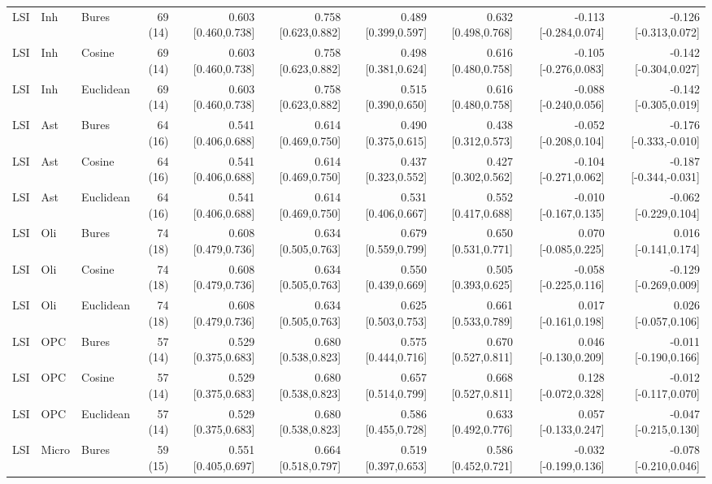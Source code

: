 \documentclass[9pt]{article}
\begin{document}
\begin{landscape}
\begin{longtable}{lllrrrrrrr}
LSI & Inh & Bures & 69 (14) & 0.603 [0.460,0.738] & 0.758 [0.623,0.882] & 0.489 [0.399,0.597] & 0.632 [0.498,0.768] & -0.113 [-0.284,0.074] & -0.126 [-0.313,0.072] \\
LSI & Inh & Cosine & 69 (14) & 0.603 [0.460,0.738] & 0.758 [0.623,0.882] & 0.498 [0.381,0.624] & 0.616 [0.480,0.758] & -0.105 [-0.276,0.083] & -0.142 [-0.304,0.027] \\
LSI & Inh & Euclidean & 69 (14) & 0.603 [0.460,0.738] & 0.758 [0.623,0.882] & 0.515 [0.390,0.650] & 0.616 [0.480,0.758] & -0.088 [-0.240,0.056] & -0.142 [-0.305,0.019] \\
LSI & Ast & Bures & 64 (16) & 0.541 [0.406,0.688] & 0.614 [0.469,0.750] & 0.490 [0.375,0.615] & 0.438 [0.312,0.573] & -0.052 [-0.208,0.104] & -0.176 [-0.333,-0.010] \\
LSI & Ast & Cosine & 64 (16) & 0.541 [0.406,0.688] & 0.614 [0.469,0.750] & 0.437 [0.323,0.552] & 0.427 [0.302,0.562] & -0.104 [-0.271,0.062] & -0.187 [-0.344,-0.031] \\
LSI & Ast & Euclidean & 64 (16) & 0.541 [0.406,0.688] & 0.614 [0.469,0.750] & 0.531 [0.406,0.667] & 0.552 [0.417,0.688] & -0.010 [-0.167,0.135] & -0.062 [-0.229,0.104] \\
LSI & Oli & Bures & 74 (18) & 0.608 [0.479,0.736] & 0.634 [0.505,0.763] & 0.679 [0.559,0.799] & 0.650 [0.531,0.771] & 0.070 [-0.085,0.225] & 0.016 [-0.141,0.174] \\
LSI & Oli & Cosine & 74 (18) & 0.608 [0.479,0.736] & 0.634 [0.505,0.763] & 0.550 [0.439,0.669] & 0.505 [0.393,0.625] & -0.058 [-0.225,0.116] & -0.129 [-0.269,0.009] \\
LSI & Oli & Euclidean & 74 (18) & 0.608 [0.479,0.736] & 0.634 [0.505,0.763] & 0.625 [0.503,0.753] & 0.661 [0.533,0.789] & 0.017 [-0.161,0.198] & 0.026 [-0.057,0.106] \\
LSI & OPC & Bures & 57 (14) & 0.529 [0.375,0.683] & 0.680 [0.538,0.823] & 0.575 [0.444,0.716] & 0.670 [0.527,0.811] & 0.046 [-0.130,0.209] & -0.011 [-0.190,0.166] \\
LSI & OPC & Cosine & 57 (14) & 0.529 [0.375,0.683] & 0.680 [0.538,0.823] & 0.657 [0.514,0.799] & 0.668 [0.527,0.811] & 0.128 [-0.072,0.328] & -0.012 [-0.117,0.070] \\
LSI & OPC & Euclidean & 57 (14) & 0.529 [0.375,0.683] & 0.680 [0.538,0.823] & 0.586 [0.455,0.728] & 0.633 [0.492,0.776] & 0.057 [-0.133,0.247] & -0.047 [-0.215,0.130] \\
LSI & Micro & Bures & 59 (15) & 0.551 [0.405,0.697] & 0.664 [0.518,0.797] & 0.519 [0.397,0.653] & 0.586 [0.452,0.721] & -0.032 [-0.199,0.136] & -0.078 [-0.210,0.046] \\

\end{longtable}
\end{landscape}
\end{document}
